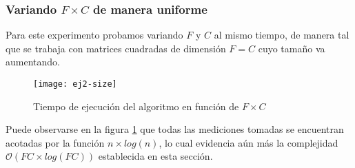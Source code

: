 \subsubsection{Variando $F \times C$ de manera uniforme}

Para este experimento probamos variando $F$ y $C$ al mismo tiempo, de manera tal que se trabaja con matrices cuadradas de dimensión $F = C$ cuyo tamaño va aumentando.

\begin{figure}[H]
	\centering
	\texttt{[image: ej2-size]}
	\caption{Tiempo de ejecución del algoritmo en función de $F \times C$}
	\label{fig:ej2-size-fig}
\end{figure}

Puede observarse en la figura \ref{fig:ej2-size-fig} que todas las mediciones tomadas se encuentran acotadas por la función $n \times log(n)$, lo cual evidencia aún más la complejidad $\mathcal{O}(FC \times log(FC))$ establecida en esta sección.